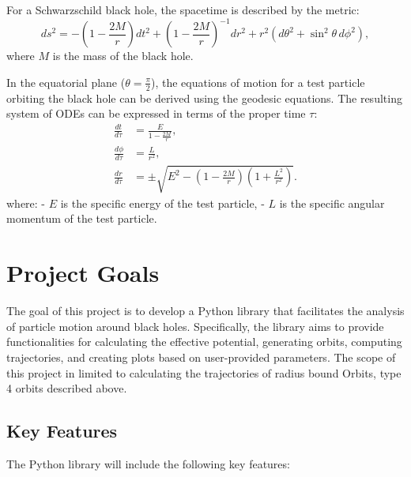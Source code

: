 \documentclass{article}
\begin{document}
For a Schwarzschild black hole, the spacetime is described by the metric:
\[
ds^2 = -\left(1 - \frac{2M}{r}\right) dt^2 + \left(1 - \frac{2M}{r}\right)^{-1} dr^2 + r^2 (d\theta^2 + \sin^2\theta \, d\phi^2),
\]
where \( M \) is the mass of the black hole.

In the equatorial plane (\(\theta = \frac{\pi}{2}\)), the equations of motion for a test particle orbiting the black hole can be derived using the geodesic equations.
The resulting system of ODEs can be expressed in terms of the proper time \(\tau\):
\begin{align*}
\frac{dt}{d\tau} &= \frac{E}{1 - \frac{2M}{r}}, \\
\frac{d\phi}{d\tau} &= \frac{L}{r^2}, \\
\frac{dr}{d\tau} &= \pm \sqrt{E^2 - \left(1 - \frac{2M}{r}\right)\left(1 + \frac{L^2}{r^2}\right)}.
\end{align*}
where:
- \( E \) is the specific energy of the test particle,
- \( L \) is the specific angular momentum of the test particle.


\section{Project Goals}

The goal of this project is to develop a Python library that facilitates the analysis of particle motion around black holes. Specifically, the library aims to provide functionalities
for calculating the effective potential, generating orbits, computing trajectories, and creating plots based on user-provided parameters. The scope of this project in limited to calculating the trajectories of radius bound Orbits, type 4 orbits described above.

\subsection{Key Features}

The Python library will include the following key features:
\end{document}
